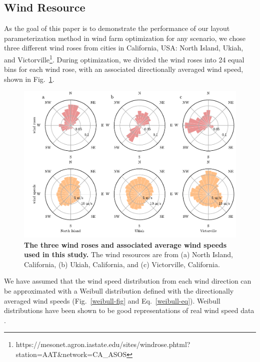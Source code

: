 \documentclass[wes, manuscript]{copernicus}
\begin{document}
\subsection{Wind Resource}
As the goal of this paper is to demonstrate the performance of our layout parameterization method in wind farm optimization for any scenario, we chose three different wind roses from cities in California, USA: North Island, Ukiah, and Victorville\footnote{https://mesonet.agron.iastate.edu/sites/windrose.phtml?station=AAT\&network=CA\_ASOS}. During optimization, we divided the wind roses into 24 equal bins for each wind rose, with an associated directionally averaged wind speed, shown in Fig.~\ref{roses}.
%
\begin{figure}
\centering
\includegraphics{paper-figures/roses}
\caption{\textbf{The three wind roses and associated average wind speeds used in this study.} The wind resources are from (a) North Island, California, (b) Ukiah, California, and (c) Victorville, California.}
\label{roses}
\end{figure}
%
We have assumed that the wind speed distribution from each wind direction can be approximated with a Weibull distribution defined with the directionally averaged wind speeds (Fig.~\ref{weibull-fig} and Eq.~\ref{weibull-eq}). Weibull distributions have been shown to be good representations of real wind speed data \citep{justus1978methods,rehman1994weibull,seguro2000modern}. 
\end{document}
